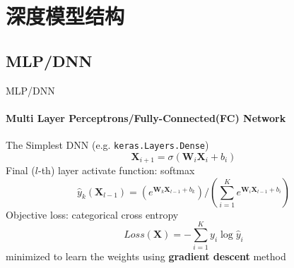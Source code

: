 \documentclass[aspectratio=169]{ctexbeamer}
\begin{document}
\section{深度模型结构}

\subsection{MLP/DNN}
\begin{frame}{MLP/DNN}
	\framesubtitle{Multi Layer Perceptrons/Fully-Connected(FC) Network}
	The Simplest DNN (e.g. \texttt{keras.Layers.Dense})
	$$\mathbf{X}_{i+1} = \sigma (\mathbf{W}_i \mathbf{X}_i + b_i)$$
	Final ($l$-th) layer activate function: softmax
	$$\hat {y} _{k} (\mathbf{X}_{l-1}) = (e^{\mathbf{W}_k \mathbf{X}_{l-1} + b_k}) /
	(\sum_{i=1}^{K} {e^{\mathbf{W}_i \mathbf{X}_{l-1} + b_i}})$$
	Objective loss:  categorical cross entropy
	$$Loss(\textbf{X}) = - \sum_{i=1}^{K}{y_i} \log {\hat y}_i$$
	minimized to learn the weights using \textbf{gradient descent} method
\end{frame}
\end{document}
